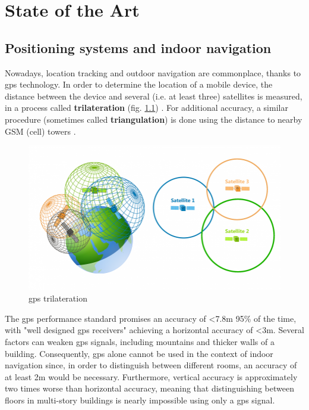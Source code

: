 \chapter{State of the Art} \label{chapter:sota}

\section{Positioning systems and indoor navigation} \label{2:indoor_navigation}

    Nowadays, location tracking and outdoor navigation are commonplace, thanks to \gls{gps} technology. In order to determine the location of a mobile device, the distance between the device and several (i.e. at least three) satellites is measured, in a process called \textbf{trilateration} (fig. \ref{2:fig:gps_trilateration}) \cite{gis2021trilateration}. For additional accuracy, a similar procedure (sometimes called \textbf{triangulation}) is done using the distance to nearby GSM (cell) towers \cite{radiojitter2018triangulation}.
    
    \begin{figure}[ht]
        \centering
             \includegraphics[width=\textwidth]{figures/gps.png}
        \caption{\gls{gps} trilateration}
        \label{2:fig:gps_trilateration}
    \end{figure}
    
    The \gls{gps} performance standard \cite{gps2008performance} promises an accuracy of <7.8m 95\% of the time, with "well designed \gls{gps} receivers" achieving a horizontal accuracy of <3m. Several factors can weaken \gls{gps} signals, including mountains and thicker walls of a building. Consequently, \gls{gps} alone cannot be used in the context of indoor navigation since, in order to distinguish between different rooms, an accuracy of at least 2m would be necessary. Furthermore, vertical accuracy is approximately two times worse than horizontal accuracy, meaning that distinguishing between floors in multi-story buildings is nearly impossible using only a \gls{gps} signal. 
    
